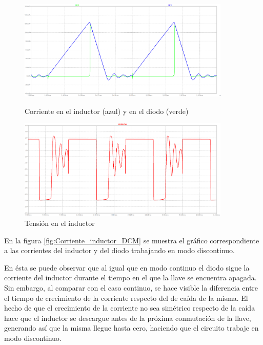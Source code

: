 \documentclass[e4_tp1_main.tex]{subfiles}
\begin{document}
	\begin{figure}[htb]
		\centering
		\begin{minipage}{0.47\textwidth}
			\centering	
			\includegraphics[width=0.9\textwidth]{images/ej4/fig3.png}
			\caption{Corriente en el inductor (azul) y en el diodo (verde)}
			\label{fig:Corriente_inductor_DCM}		
		\end{minipage}
		\hfill
		\begin{minipage}{0.47\textwidth}
			\centering
			\includegraphics[width=0.9\textwidth]{images/ej4/fig4.png}
			\caption{Tensi\'on en el inductor}
			\label{fig:Tension-inductor-DCM}
		\end{minipage}
	\end{figure}
	
	
	En la figura \ref{fig:Corriente_inductor_DCM} se muestra el gráfico correspondiente a las corrientes del inductor y del diodo trabajando en modo discontinuo.
	
	En ésta se puede observar que al igual que en modo continuo el diodo sigue la corriente del inductor durante el tiempo en el que la llave se encuentra apagada. Sin embargo, al comparar con el caso continuo, se hace visible la diferencia entre el tiempo de crecimiento de la corriente respecto del de caída de la misma. El hecho de que el crecimiento de la corriente no sea simétrico respecto de la caída hace que el inductor se descargue antes de la próxima conmutación de la llave, generando así que la misma llegue hasta cero, haciendo que el circuito trabaje en modo discontinuo.
	
\end{document}
